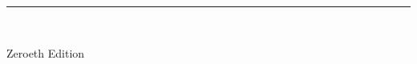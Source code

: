\documentclass[../Main.tex]{subfiles}
\begin{document}
    \begin{titlepage}
        \begin{flushleft}

            \textbf{\selectfont\Huge \BigTitle}

            \par\noindent\rule{\textwidth}{4pt}\\

            \textbf{\large \textit{\LittleTitle}}

            \begin{flushright}
                \Large Zeroeth Edition
            \end{flushright}

            \vspace{\fill}

        \end{flushleft}
    \end{titlepage}

    \restoregeometry
\end{document}
